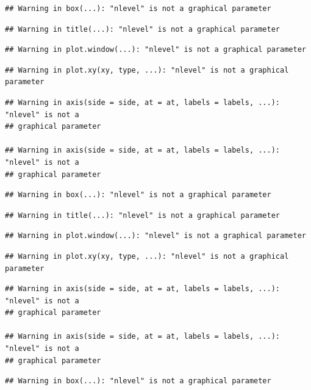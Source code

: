 \documentclass[
]{article}
\begin{document}
\begin{verbatim}
## Warning in box(...): "nlevel" is not a graphical parameter
\end{verbatim}

\begin{verbatim}
## Warning in title(...): "nlevel" is not a graphical parameter
\end{verbatim}

\begin{verbatim}
## Warning in plot.window(...): "nlevel" is not a graphical parameter
\end{verbatim}

\begin{verbatim}
## Warning in plot.xy(xy, type, ...): "nlevel" is not a graphical parameter
\end{verbatim}

\begin{verbatim}
## Warning in axis(side = side, at = at, labels = labels, ...): "nlevel" is not a
## graphical parameter

## Warning in axis(side = side, at = at, labels = labels, ...): "nlevel" is not a
## graphical parameter
\end{verbatim}

\begin{verbatim}
## Warning in box(...): "nlevel" is not a graphical parameter
\end{verbatim}

\begin{verbatim}
## Warning in title(...): "nlevel" is not a graphical parameter
\end{verbatim}

\begin{verbatim}
## Warning in plot.window(...): "nlevel" is not a graphical parameter
\end{verbatim}

\begin{verbatim}
## Warning in plot.xy(xy, type, ...): "nlevel" is not a graphical parameter
\end{verbatim}

\begin{verbatim}
## Warning in axis(side = side, at = at, labels = labels, ...): "nlevel" is not a
## graphical parameter

## Warning in axis(side = side, at = at, labels = labels, ...): "nlevel" is not a
## graphical parameter
\end{verbatim}

\begin{verbatim}
## Warning in box(...): "nlevel" is not a graphical parameter
\end{verbatim}
\end{document}
